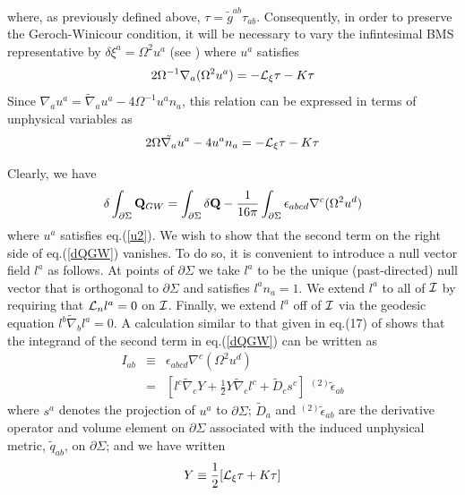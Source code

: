 where, as previously defined above, $\tau = \tilde{g}^{ab}
\tau_{ab}$. Consequently, in order to preserve the Geroch-Winicour
condition, it will be necessary to vary the infintesimal BMS
representative by $\delta \xi^a = \Omega^2 u^a$ (see \cite{gw}) where
$u^a$ satisfies
\begin{equation}
2 \Omega^{-1} \nabla_a (\Omega^2 u^a) = - {\cal L}_\xi \tau - K \tau
\label{u}
\end{equation}
Since $\nabla_a u^a = \tilde{\nabla}_a u^a - 4 \Omega^{-1} u^a n_a$,
this relation can be expressed in terms of unphysical variables as
\begin{equation}
2 \Omega \tilde{\nabla_a} u^a - 4 u^a n_a = - {\cal L}_\xi
\tau - K \tau
\label{u2}
\end{equation}

Clearly, we have
\begin{equation}
\delta \int_{\partial \Sigma} {\bf Q}_{GW} = \int_{\partial \Sigma}
\delta {\bf Q} - \frac{1}{16 \pi} \int_{\partial \Sigma}
\epsilon_{abcd} \nabla^c (\Omega^2 u^d)
\label{dQGW}
\end{equation}
where $u^a$ satisfies eq.(\ref{u2}). We wish to show that the second
term on the right side of eq.(\ref{dQGW}) vanishes. To do so, it is
convenient to introduce a null vector field $l^a$ as follows. At
points of $\partial \Sigma$ we take $l^a$ to be the unique
(past-directed) null vector that is orthogonal to $\partial \Sigma$
and satisfies $l^a n_a = 1$. We extend $l^a$ to all of $\cal I$ by
requiring that ${\cal L}_n l^a = 0$ on $\cal I$. Finally, we extend
$l^a$ off of $\cal I$ via the geodesic equation $l^b \tilde{\nabla}_b
l^a = 0$. A calculation similar to that given in eq.(17) of \cite{gw}
shows that the integrand of the second term in eq.(\ref{dQGW}) can be
written as
\begin{eqnarray}
I_{ab} & \equiv & \epsilon_{abcd} \nabla^c (\Omega^2 u^d) \nonumber \\
& = & [l^c \tilde{\nabla}_c Y + \frac{1}{2} Y \tilde{\nabla}_c l^c + \tilde{D}_c s^c] \,\, {}^{(2)} \tilde{\epsilon}_{ab}
\label{Iab}
\end{eqnarray}
where $s^a$ denotes the projection of $u^a$ to $\partial \Sigma$;
$\tilde{D}_a$ and ${}^{(2)} \tilde{\epsilon}_{ab}$ are the derivative
operator and volume element on $\partial \Sigma$ associated with the
induced unphysical metric, $\tilde{q}_{ab}$, on $\partial \Sigma$; and
we have written
\begin{equation}
Y \equiv  \frac{1}{2} [{\cal L}_\xi \tau + K \tau]
\label{Y}
\end{equation}
